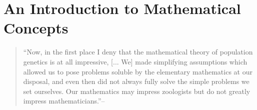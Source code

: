 % 
% 
% 

\setcounter{figure}{0}
\setcounter{section}{0}
\setcounter{equation}{0}
\setcounter{chapter}{0}
\renewcommand{\thechapter}{\Alph{chapter}.}
\renewcommand{\theequation}{\Alph{chapter}.\arabic{equation}}
\renewcommand{\thesection}{\Alph{chapter}.\arabic{section}}
\renewcommand{\thefigure}{\Alph{chapter}.\arabic{figure}}


\chapter{An Introduction to Mathematical Concepts}
\begin{quote}
``Now, in the first place I deny that the mathematical theory of
population genetics is at all impressive, [... We] made simplifying assumptions which allowed us to pose problems
soluble by the elementary mathematics at our disposal, and even then
did not always fully solve the simple problems we set ourselves. Our
mathematics may impress zoologists but do not greatly impress
mathematicians.''--\citeauthor{haldane1964defense} 
\end{quote}

